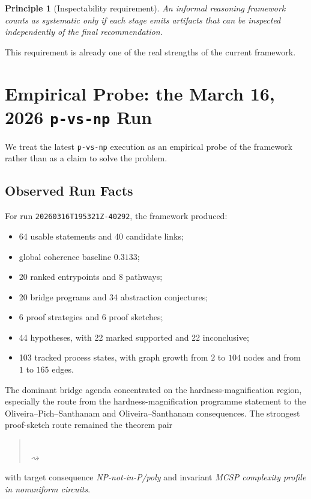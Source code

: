 \documentclass[11pt]{article}
\newtheorem{principle}{Principle}
\begin{document}
\begin{principle}[Inspectability requirement]
An informal reasoning framework counts as systematic only if each stage emits artifacts that can be inspected independently of the final recommendation.
\end{principle}

This requirement is already one of the real strengths of the current framework.

\section{Empirical Probe: the March 16, 2026 \texttt{p-vs-np} Run}

We treat the latest \texttt{p-vs-np} execution as an empirical probe of the framework rather than as a claim to solve the problem.

\subsection{Observed Run Facts}

For run \texttt{20260316T195321Z-40292}, the framework produced:

\begin{itemize}[leftmargin=*,itemsep=0.2em]
\item 64 usable statements and 40 candidate links;
\item global coherence baseline $0.3133$;
\item 20 ranked entrypoints and 8 pathways;
\item 20 bridge programs and 34 abstraction conjectures;
\item 6 proof strategies and 6 proof sketches;
\item 44 hypotheses, with 22 marked supported and 22 inconclusive;
\item 103 tracked process states, with graph growth from $2$ to $104$ nodes and from $1$ to $165$ edges.
\end{itemize}

The dominant bridge agenda concentrated on the hardness-magnification region, especially the route from the hardness-magnification programme statement to the Oliveira--Pich--Santhanam and Oliveira--Santhanam consequences. The strongest proof-sketch route remained the theorem pair
\begin{quote}
\\
$\rightsquigarrow$\\
\end{quote}
with target consequence \textit{NP-not-in-P/poly} and invariant \textit{MCSP complexity profile in nonuniform circuits}.
\end{document}
